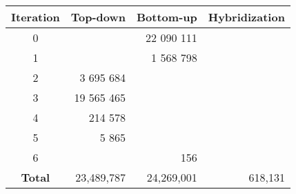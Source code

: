 \documentclass[
  convert={
    density=300 -alpha deactivate,
    size=1080x800,
    outext=.png
  },
]{standalone}
\begin{document}
\begin{tabular}{c||r|r|r}
    \textbf{Iteration} & \textbf{Top-down} & \textbf{Bottom-up} & \textbf{Hybridization} \\ 
    \hline 
    \hline 
    0 & \color{red}{27} & 22 090 111 & \color{red}{27} \\ 
    1 & \color{red}{8 156} & 1 568 798 & \color{red}{8 156} \\ 
    \hline 
    2 & 3 695 684 & \color{blue}{587 893} & \color{blue}{587 893} \\ 
    3 & 19 565 465 & \color{blue}{12 586} & \color{blue}{12 586} \\ 
    4 & 214 578 & \color{blue}{8 256} & \color{blue}{8 256} \\ 
    5 & 5 865 & \color{blue}{1 201} & \color{blue}{1 201} \\ 
    \hline 
    6 & \color{red}{12} & 156 & \color{red}{12} \\ 
    \hline
    \textbf{Total} & 23,489,787 & 24,269,001 & 618,131 
\end{tabular} 
\end{document}
